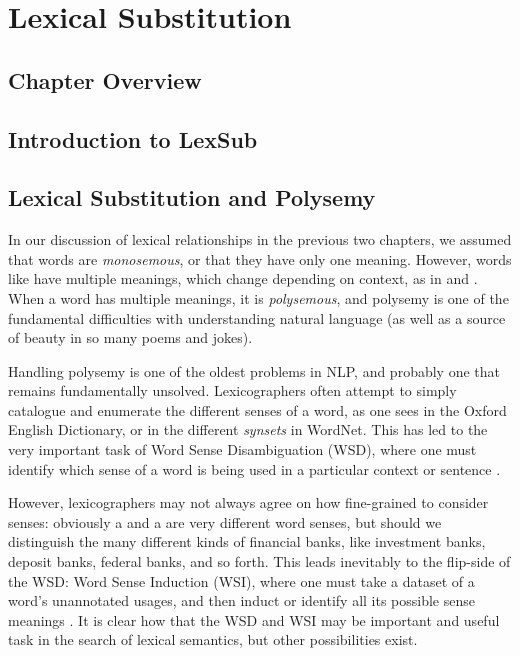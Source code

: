 \chapter{Lexical Substitution}


\begin{comment}
  Outline
  - Chapter Summary
  - Introduction to Lexsub
  - Prior Work
  - Proposed model
  - Evaluation
  - Analysis
  - Chapter Summary
\end{comment}

\section{Chapter Overview}

\section{Introduction to LexSub}

\section{Lexical Substitution and Polysemy}
\label{sec:lexsub}

In our discussion of lexical relationships in the previous two chapters, we assumed
that words are {\em monosemous}, or that they have only one meaning. However,
words like  have multiple meanings, which change depending on
context, as in  and . When a word has
multiple meanings, it is {\em polysemous}, and polysemy is one of the
fundamental difficulties with understanding natural language (as well as a
source of beauty in so many poems and jokes).

Handling polysemy is one of the oldest problems in NLP, and probably one that
remains fundamentally unsolved. Lexicographers often attempt to simply
catalogue and enumerate the different senses of a word, as one sees in the
Oxford English Dictionary, or in the different {\em synsets} in WordNet.
This has led to the very important task of Word Sense Disambiguation (WSD),
where one must identify which sense of a word is being used in a particular
context or sentence \cite{needcite}.

However, lexicographers may not always agree on how fine-grained to consider
senses: obviously a  and a  are very
different word senses, but should we distinguish the many different kinds of
financial banks, like investment banks, deposit banks, federal banks, and so
forth. This leads inevitably to the flip-side of the WSD: Word Sense Induction
(WSI), where one must take a dataset of a word's unannotated usages, and then
induct or identify all its possible sense meanings \cite{needcite,qiu:2016:emnlp}. It is clear
how that the WSD and WSI may be important and useful task in the search of
lexical semantics, but other possibilities exist.

